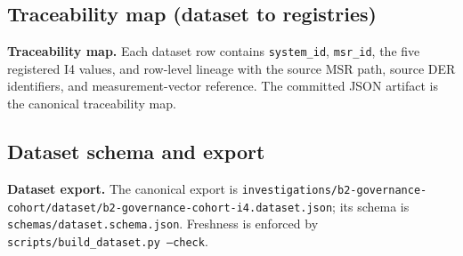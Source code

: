 \subsection{Traceability map (dataset to registries)}
\textbf{Traceability map.} Each dataset row contains \texttt{system\_id}, \texttt{msr\_id}, the five registered I4 values, and row-level lineage with the source MSR path, source DER identifiers, and measurement-vector reference. The committed JSON artifact is the canonical traceability map.

\subsection{Dataset schema and export}
\textbf{Dataset export.} The canonical export is \texttt{investigations/b2-governance-cohort/dataset/b2-governance-cohort-i4.dataset.json}; its schema is \texttt{schemas/dataset.schema.json}. Freshness is enforced by \texttt{scripts/build\_dataset.py --check}.
